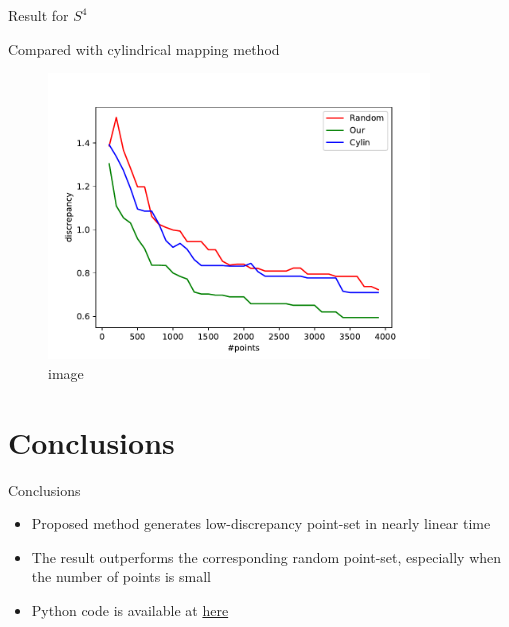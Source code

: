 \documentclass[10pt,ignorenonframetext,serif,onlymath]{beamer}
\begin{document}
\begin{frame}{Result for \(S^4\)}
\protect\hypertarget{result-for-s4}{}

Compared with cylindrical mapping method

\begin{figure}
\centering
\includegraphics[width=0.9\textwidth,height=\textheight]{res-S4-cylin.pdf}
\caption{image}
\end{figure}

\end{frame}

\hypertarget{conclusions}{%
\section{Conclusions}\label{conclusions}}

\begin{frame}{Conclusions}
\protect\hypertarget{conclusions-1}{}

\begin{itemize}
\item
  Proposed method generates low-discrepancy point-set in nearly linear
  time
\item
  The result outperforms the corresponding random point-set, especially
  when the number of points is small
\item
  Python code is available at
  \href{http://github.com/luk036/n-sphere/}{here}
\end{itemize}

\end{frame}
\end{document}
